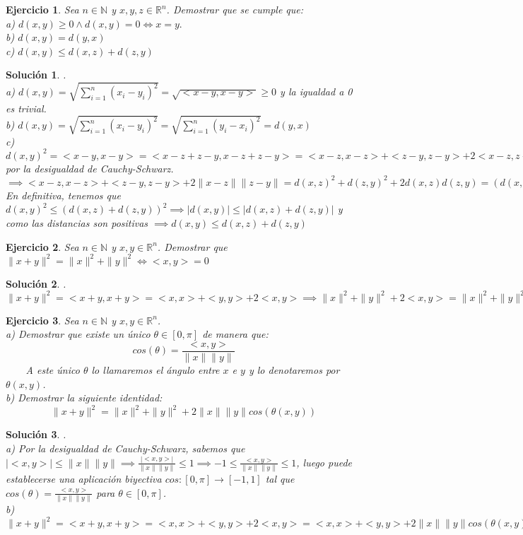 \documentclass[11pt, a4paper]{article}
\newif\IfInSansMode
\newcommand{\R}{\mathbb{R}} \newcommand{\N}{\mathbb{N}}
\theoremstyle{theorem-style}
\theoremstyle{definition-style}
\newtheorem{ejer}{Ejercicio}[section]
\theoremstyle{remark-style}
\newtheorem*{sol}{Solución}
\theoremstyle{example-style}
\begin{document}
\begin{ejer}
Sea $n \in \N$ y $x,y,z \in \R^n$. Demostrar que se cumple que:
 \\ a) $d(x,y) \ge 0 \land d(x,y) = 0 \Leftrightarrow x = y.$ \\
b) $d(x,y)=d(y,x) $
 \\ c) $d(x,y) \le d(x,z)+d(z,y)$
\end{ejer}

\begin{sol}.
\\ a) $ d(x,y) = \displaystyle{\sqrt{\sum_{i=1}^{n}(x_i-y_i)^2}} = \sqrt{<x-y,x-y>} \ge 0$ y la igualdad a 0 es trivial. \\
b) $ d(x,y) = \displaystyle{\sqrt{\sum_{i=1}^{n}(x_i-y_i)^2}} = \displaystyle{\sqrt{\sum_{i=1}^{n}(y_i-x_i)^2}} = d(y,x)$ \\
c) $ d(x,y)^2 = <x-y,x-y> = <x-z+z-y,x-z+z-y> = <x-z,x-z> + <z-y,z-y> + 2<x-z,z-y> \ \le \ <x-z,x-z> + <z-y,z-y> + 2\|x-z\| \|z-y\|$ por la desigualdad de Cauchy-Schwarz. $ \implies <x-z,x-z> + <z-y,z-y> + 2\|x-z\| \|z-y\| = d(x,z)^2+d(z,y)^2+2d(x,z)d(z,y) = (d(x,z)+d(z,y))^2.$ En definitiva, tenemos que $ d(x,y)^2 \le (d(x,z)+d(z,y))^2 \implies |d(x,y)| \le |d(x,z)+d(z,y)|$ y como las distancias son positivas $ \implies d(x,y) \le d(x,z)+d(z,y)$
\end{sol}

\begin{ejer}
Sea $n \in \N$ y $x,y \in \R^n$. Demostrar que $ \|x+y\|^2 = \|x\|^2+\|y\|^2 \Leftrightarrow <x,y> = 0$
\end{ejer}

\begin{sol}.
\\ $ \|x+y\|^2 = <x+y,x+y> = <x,x> + <y,y> + 2<x,y> \implies \|x\|^2+\|y\|^2 + 2<x,y> = \|x\|^2+\|y\|^2 \Leftrightarrow 2<x,y> = 0 \Leftrightarrow <x,y> = 0$
\end{sol}

\begin{ejer}
Sea $n \in \N$ y $x,y \in \R^n$. \\
a) Demostrar que existe un único $ \theta \in [0, \pi]$ de manera que: $$ cos(\theta) = \frac{<x,y>}{\|x\|\|y\|}$$ \ \ \ \ A este único $\theta$ lo llamaremos el ángulo entre $x$ e $y$ y lo denotaremos por $\theta(x, y)$. \\
b) Demostrar la siguiente identidad: $$ \|x+y\|^2 = \|x\|^2+\|y\|^2 + 2 \|x\|\|y\|cos(\theta(x,y))$$
\end{ejer}

\begin{sol}.
\\ a) Por la desigualdad de Cauchy-Schwarz, sabemos que $ |<x,y>| \le \|x\|\|y\| \implies \frac{|<x,y>|}{\|x\|\|y\|} \le 1 \implies -1 \le \frac{<x,y>}{\|x\|\|y\|} \le 1$, luego puede establecerse una aplicación biyectiva $ cos: [0,\pi] \rightarrow [-1,1]$ tal que $cos(\theta) = \frac{<x,y>}{\|x\|\|y\|}$ para $ \theta \in [0,\pi]$. \\
b) $ \|x+y\|^2 = <x+y,x+y> = <x,x> + <y,y> + 2<x,y> = <x,x> + <y,y> + 2\|x\|\|y\|cos(\theta(x,y))$ \\
\end{sol}
\end{document}
